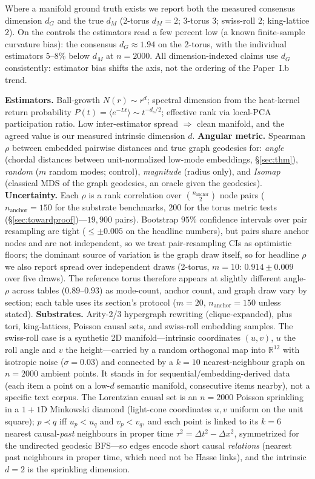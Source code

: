 \documentclass[review]{siamart220329}
\begin{document}
\noindent Where a manifold ground truth exists we report both the measured
consensus dimension $d_G$ and the true $d_M$ (2-torus $d_M{=}2$; 3-torus $3$;
swiss-roll $2$; king-lattice $2$). On the controls the estimators read a few
percent low (a known finite-sample curvature bias): the consensus
$d_G\approx1.94$ on the 2-torus, with the individual estimators $5$--$8\%$ below
$d_M$ at $n{=}2000$. All dimension-indexed claims use $d_G$ consistently:
estimator bias shifts the axis, not the ordering of the Paper~I.b trend.

\textbf{Estimators.} Ball-growth $N(r)\sim r^d$; spectral dimension from the
heat-kernel return probability $P(t)=\langle e^{-Lt}\rangle\sim t^{-d_s/2}$;
effective rank via local-PCA participation ratio. Low inter-estimator spread
$\Rightarrow$ clean manifold, and the agreed value is our measured intrinsic
dimension $d$. \textbf{Angular metric.} Spearman $\rho$ between embedded pairwise
distances and true graph geodesics for: \emph{angle} (chordal distances
between unit-normalized low-mode
embeddings, \S\ref{sec:thm}), \emph{random} ($m$ random modes; control), \emph{magnitude} (radius
only), and \emph{Isomap} (classical MDS of the graph geodesics, an oracle given the
geodesics). \textbf{Uncertainty.}
Each $\rho$ is a rank correlation over $\binom{n_{\mathrm{anchor}}}{2}$ node pairs
($n_{\mathrm{anchor}}=150$ for the substrate benchmarks, $200$ for the torus
metric tests (\S\ref{sec:towardproof})---$19{,}900$ pairs). Bootstrap
$95\%$ confidence intervals over pair resampling are tight ($\le\pm0.005$ on the
headline numbers), but pairs share anchor nodes and are not independent, so
we treat pair-resampling CIs as optimistic floors; the dominant source of
variation is the graph draw itself, so
for headline $\rho$ we also report spread over independent draws (2-torus,
$m{=}10$: $0.914\pm0.009$ over five draws). The reference torus therefore appears
at slightly different angle-$\rho$ across tables ($0.89$--$0.93$) as mode-count,
anchor count, and graph draw vary by section; each table uses its section's
protocol ($m{=}20$, $n_{\mathrm{anchor}}{=}150$ unless stated).
\textbf{Substrates.} Arity-2/3
hypergraph rewriting (clique-expanded), plus tori, king-lattices, Poisson causal
sets, and swiss-roll embedding samples. The swiss-roll case is a
synthetic 2D manifold---intrinsic coordinates $(u,v)$, $u$ the roll angle and
$v$ the height---carried by a random orthogonal map into $\mathbb{R}^{12}$ with
isotropic noise ($\sigma{=}0.03$) and connected by a $k{=}10$ nearest-neighbour
graph on $n{=}2000$ ambient points. It stands in for sequential/embedding-derived
data (each item a point on a low-$d$ semantic manifold, consecutive items
nearby), not a specific text corpus. The Lorentzian causal set is an
$n{=}2000$ Poisson sprinkling in a $1{+}1$D Minkowski diamond (light-cone
coordinates $u,v$ uniform on the unit square); $p\prec q$ iff $u_p<u_q$ and
$v_p<v_q$, and each point is linked to its $k{=}6$ nearest causal-\emph{past}
neighbours in proper time $\tau^2=\Delta t^2-\Delta x^2$, symmetrized for the
undirected geodesic BFS---so edges encode short causal \emph{relations}
(nearest past neighbours in proper time, which need not be Hasse links), and
the intrinsic $d{=}2$ is the sprinkling dimension.
\end{document}

